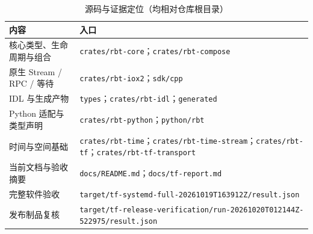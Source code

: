 \documentclass[UTF8,fontset=none,zihao=-4,a4paper]{ctexart}
\newcommand{\src}[1]{\nolinkurl{#1}}
\begin{document}
\begin{table}[htbp]
\centering\footnotesize
\caption{源码与证据定位（均相对仓库根目录）}\label{tab:sources}
\begin{tabularx}{\textwidth}{p{36mm}Y}
\toprule
内容 & 入口 \\\midrule
核心类型、生命周期与组合 & \src{crates/rbt-core}；\src{crates/rbt-compose} \\
原生 Stream / RPC / 等待 & \src{crates/rbt-iox2}；\src{sdk/cpp} \\
IDL 与生成产物 & \src{types}；\src{crates/rbt-idl}；\src{generated} \\
Python 适配与类型声明 & \src{crates/rbt-python}；\src{python/rbt} \\
时间与空间基础 & \src{crates/rbt-time}；\src{crates/rbt-time-stream}；\src{crates/rbt-tf}；\src{crates/rbt-tf-transport} \\
当前文档与验收摘要 & \src{docs/README.md}；\src{docs/tf-report.md} \\
完整软件验收 & \src{target/tf-systemd-full-20261019T163912Z/result.json} \\
发布制品复核 & \src{target/tf-release-verification/run-20261020T012144Z-522975/result.json} \\
\bottomrule
\end{tabularx}
\end{table}
\end{document}
